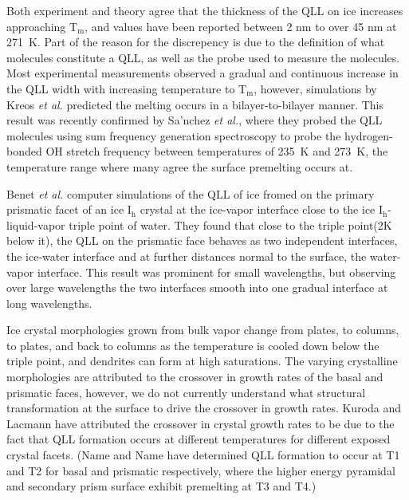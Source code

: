 Both experiment and theory agree that the thickness of the QLL on ice
increases approaching T$_\mathrm{m}$, and values have been reported
between 2 nm to over 45 nm at 271~K. Part of the reason for the
discrepency is due to the definition of what molecules constitute a
QLL, as well as the probe used to measure the molecules. Most
experimental measurements observed a gradual and continuous increase
in the QLL width with increasing temperature to T$_\mathrm{m}$,
however, simulations by Kreos \textit{et al.} predicted the melting
occurs in a bilayer-to-bilayer manner. This result was recently
confirmed by Sa'nchez \textit{et al.}, where they probed the QLL
molecules using sum frequency generation spectroscopy to probe the
hydrogen-bonded OH stretch frequency between temperatures of 235~K
and 273~K, the temperature range where many agree the surface
premelting occurs at.

Benet \textit{et al.} computer simulations of the QLL of ice fromed on
the primary prismatic facet of an ice I$_\mathrm{h}$ crystal at the
ice-vapor interface close to the ice I$_\mathrm{h}$-liquid-vapor
triple point of water.\cite{Benet17} They found that close to the
triple point(2K below it), the QLL on the prismatic face behaves as
two independent interfaces, the ice-water interface and at further
distances normal to the surface, the water-vapor interface. This
result was prominent for small wavelengths, but observing over large
wavelengths the two interfaces smooth into one gradual interface at
long wavelengths.

Ice crystal morphologies grown from bulk vapor change from plates, to
columns, to plates, and back to columns as the temperature is cooled
down below the triple point, and dendrites can form at high
saturations.\cite{K. G. Libbrecht, Rep. Prog. Phys. 68, 855 (2005).}
The varying crystalline morphologies are attributed to the crossover
in growth rates of the basal and prismatic faces, however, we do not
currently understand what structural transformation at the surface to
drive the crossover in growth rates.\cite{1,2,4,5} Kuroda and Lacmann
have attributed the crossover in crystal growth rates to be due to the
fact that QLL formation occurs at different temperatures for different
exposed crystal facets.\cite{6} (Name and Name have determined QLL
formation to occur at T1 and T2 for basal and prismatic respectively,
where the higher energy pyramidal and secondary prism surface exhibit
premelting at T3 and T4.)

